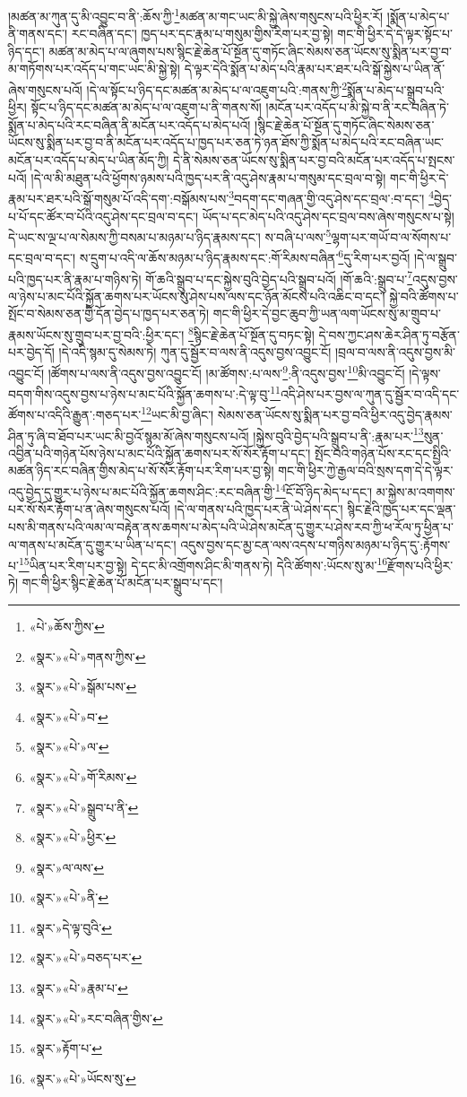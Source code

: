 །མཚན་མ་ཀུན་དུ་མི་འབྱུང་བ་ནི་:ཆོས་ཀྱི་\footnote{«པེ་»ཆོས་ཀྱིས་}མཚན་མ་གང་ཡང་མི་སྐྱེ་ཞེས་གསུངས་པའི་ཕྱིར་རོ། །སྨོན་པ་མེད་པ་ནི་གནས་དང་། རང་བཞིན་དང་། ཁྱད་པར་དང་རྣམ་པ་གསུམ་གྱིས་རིག་པར་བྱ་སྟེ། གང་གི་ཕྱིར་དེ་དེ་ལྟར་སྟོང་པ་ཉིད་དང་། མཚན་མ་མེད་པ་ལ་ཞུགས་པས་སྙིང་རྗེ་ཆེན་པོ་སྔོན་དུ་གཏོང་ཞིང་སེམས་ཅན་ཡོངས་སུ་སྨིན་པར་བྱ་བ་མ་གཏོགས་པར་འདོད་པ་གང་ཡང་མི་སྐྱེ་སྟེ། དེ་ལྟར་དེའི་སྨོན་པ་མེད་པའི་རྣམ་པར་ཐར་པའི་སྒོ་སྐྱེས་པ་ཡིན་ནོ་ཞེས་གསུངས་པའོ། །དེ་ལ་སྟོང་པ་ཉིད་དང་མཚན་མ་མེད་པ་ལ་འཇུག་པའི་:གནས་ཀྱི་\footnote{«སྣར་»«པེ་»གནས་ཀྱིས་}སྨོན་པ་མེད་པ་སྒྲུབ་པའི་ཕྱིར། སྟོང་པ་ཉིད་དང་མཚན་མ་མེད་པ་ལ་འཇུག་པ་ནི་གནས་སོ། །མངོན་པར་འདོད་པ་མི་སྐྱེ་བ་ནི་རང་བཞིན་ཏེ་སྨོན་པ་མེད་པའི་རང་བཞིན་ནི་མངོན་པར་འདོད་པ་མེད་པའོ། །སྙིང་རྗེ་ཆེན་པོ་སྔོན་དུ་གཏོང་ཞིང་སེམས་ཅན་ཡོངས་སུ་སྨིན་པར་བྱ་བ་ནི་མངོན་པར་འདོད་པ་ཁྱད་པར་ཅན་ཏེ་ཉན་ཐོས་ཀྱི་སྨོན་པ་མེད་པའི་རང་བཞིན་ཡང་མངོན་པར་འདོད་པ་མེད་པ་ཡིན་མོད་ཀྱི། དེ་ནི་སེམས་ཅན་ཡོངས་སུ་སྨིན་པར་བྱ་བའི་མངོན་པར་འདོད་པ་སྤངས་པའོ། །དེ་ལ་མི་མཐུན་པའི་ཕྱོགས་ཉམས་པའི་ཁྱད་པར་ནི་འདུ་ཤེས་རྣམ་པ་གསུམ་དང་བྲལ་བ་སྟེ། གང་གི་ཕྱིར་དེ་རྣམ་པར་ཐར་པའི་སྒོ་གསུམ་པོ་འདི་དག་:བསྒོམས་པས་\footnote{«སྣར་»«པེ་»སྒོམ་པས་}བདག་དང་གཞན་གྱི་འདུ་ཤེས་དང་བྲལ་:བ་དང་། \footnote{«སྣར་»«པེ་»བ་}བྱེད་པ་པོ་དང་ཚོར་བ་པོའི་འདུ་ཤེས་དང་བྲལ་བ་དང་། ཡོད་པ་དང་མེད་པའི་འདུ་ཤེས་དང་བྲལ་བས་ཞེས་གསུངས་པ་སྟེ། དེ་ཡང་ས་ལྔ་པ་ལ་སེམས་ཀྱི་བསམ་པ་མཉམ་པ་ཉིད་རྣམས་དང་། ས་བཞི་པ་ལས་\footnote{«སྣར་»«པེ་»ལ་}ལྷག་པར་གཡོ་བ་ལ་སོགས་པ་དང་བྲལ་བ་དང་། ས་དྲུག་པ་འདི་ལ་ཆོས་མཉམ་པ་ཉིད་རྣམས་དང་:གོ་རིམས་བཞིན་\footnote{«སྣར་»«པེ་»གོ་རིམས་}དུ་རིག་པར་བྱའོ། །དེ་ལ་སྒྲུབ་པའི་ཁྱད་པར་ནི་རྣམ་པ་གཉིས་ཏེ། གོ་ཆའི་སྒྲུབ་པ་དང་སྐྱེས་བུའི་བྱེད་པའི་སྒྲུབ་པའོ། །གོ་ཆའི་:སྒྲུབ་པ་\footnote{«སྣར་»«པེ་»སྒྲུབ་པ་ནི་}འདུས་བྱས་ལ་ཉེས་པ་མང་པོའི་སྐྱོན་ཆགས་པར་ཡོངས་སུ་ཤེས་པས་ལས་དང་ཉོན་མོངས་པའི་འཆིང་བ་དང་། སྐྱེ་བའི་ཚོགས་པ་སྤོང་བ་སེམས་ཅན་གྱི་དོན་བྱེད་པ་ཁྱད་པར་ཅན་ཏེ། གང་གི་ཕྱིར་དེ་བྱང་ཆུབ་ཀྱི་ཡན་ལག་ཡོངས་སུ་མ་གྲུབ་པ་རྣམས་ཡོངས་སུ་གྲུབ་པར་བྱ་བའི་:ཕྱིར་དང་། \footnote{«སྣར་»«པེ་»ཕྱིར་}སྙིང་རྗེ་ཆེན་པོ་སྔོན་དུ་བཏང་སྟེ། དེ་བས་ཀྱང་ཤས་ཆེར་ཤིན་ཏུ་བརྩོན་པར་བྱེད་དོ། །དེ་འདི་སྙམ་དུ་སེམས་ཏེ། ཀུན་དུ་སྦྱོར་བ་ལས་ནི་འདུས་བྱས་འབྱུང་ངོ། །བྲལ་བ་ལས་ནི་འདུས་བྱས་མི་འབྱུང་ངོ། །ཚོགས་པ་ལས་ནི་འདུས་བྱས་འབྱུང་ངོ། །མ་ཚོགས་:པ་ལས་\footnote{«སྣར་»ལ་ལས་}:ནི་འདུས་བྱས་\footnote{«སྣར་»«པེ་»ནི་}མི་འབྱུང་ངོ། །དེ་ལྟས་བདག་གིས་འདུས་བྱས་པ་ཉེས་པ་མང་པོའི་སྐྱོན་ཆགས་པ་:དེ་ལྟ་བུ་\footnote{«སྣར་»དེ་ལྟ་བུའི་}འདི་ཤེས་པར་བྱས་ལ་ཀུན་དུ་སྦྱོར་བ་འདི་དང་ཚོགས་པ་འདིའི་རྒྱུན་:གཅད་པར་\footnote{«སྣར་»«པེ་»བཅད་པར་}ཡང་མི་བྱ་ཞིང་། སེམས་ཅན་ཡོངས་སུ་སྨིན་པར་བྱ་བའི་ཕྱིར་འདུ་བྱེད་རྣམས་ཤིན་ཏུ་ཞི་བ་ཐོབ་པར་ཡང་མི་བྱའོ་སྙམ་མོ་ཞེས་གསུངས་པའོ། །སྐྱེས་བུའི་བྱེད་པའི་སྒྲུབ་པ་ནི་:རྣམ་པར་\footnote{«སྣར་»«པེ་»རྣམ་པ་}སུན་འབྱིན་པའི་གཉེན་པོས་ཉེས་པ་མང་པོའི་སྐྱོན་ཆགས་པར་སོ་སོར་རྟོག་པ་དང་། སྤོང་བའི་གཉེན་པོས་རང་དང་སྤྱིའི་མཚན་ཉིད་རང་བཞིན་གྱིས་མེད་པ་སོ་སོར་རྟོག་པར་རིག་པར་བྱ་སྟེ། གང་གི་ཕྱིར་ཀྱེ་རྒྱལ་བའི་སྲས་དག་དེ་དེ་ལྟར་འདུ་བྱེད་དུ་གྱུར་པ་ཉེས་པ་མང་པོའི་སྐྱོན་ཆགས་ཤིང་:རང་བཞིན་གྱི་\footnote{«སྣར་»«པེ་»རང་བཞིན་གྱིས་}ངོ་བོ་ཉིད་མེད་པ་དང་། མ་སྐྱེས་མ་འགགས་པར་སོ་སོར་རྟོག་པ་ན་ཞེས་གསུངས་པའོ། །དེ་ལ་གནས་པའི་ཁྱད་པར་ནི་ཡེ་ཤེས་དང་། སྙིང་རྗེའི་ཁྱད་པར་དང་ལྡན་པས་མི་གནས་པའི་ལམ་ལ་བརྟེན་ནས་ཆགས་པ་མེད་པའི་ཡེ་ཤེས་མངོན་དུ་གྱུར་པ་ཤེས་རབ་ཀྱི་ཕ་རོལ་ཏུ་ཕྱིན་པ་ལ་གནས་པ་མངོན་དུ་གྱུར་པ་ཡིན་པ་དང་། འདུས་བྱས་དང་མྱ་ངན་ལས་འདས་པ་གཉིས་མཉམ་པ་ཉིད་དུ་:རྟོགས་པ་\footnote{«སྣར་»རྟོག་པ་}ཡིན་པར་རིག་པར་བྱ་སྟེ། དེ་དང་མི་འགྲོགས་ཤིང་མི་གནས་ཏེ། དེའི་ཚོགས་:ཡོངས་སུ་མ་\footnote{«སྣར་»«པེ་»ཡོངས་སུ་}རྫོགས་པའི་ཕྱིར་ཏེ། གང་གི་ཕྱིར་སྙིང་རྗེ་ཆེན་པོ་མངོན་པར་སྒྲུབ་པ་དང་། 